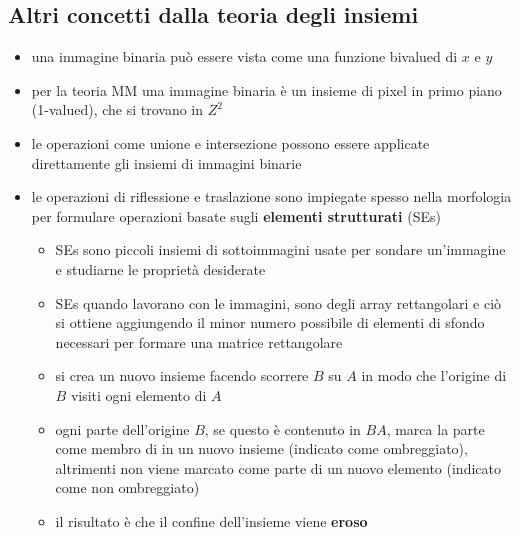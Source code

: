 \subsection{Altri concetti dalla teoria degli insiemi}
\begin{itemize}
	\item una immagine binaria può essere vista come una funzione bivalued di $x$ e $y$
	
	\item per la teoria MM una immagine binaria è un insieme di pixel in primo piano (1-valued), che si trovano in $Z^2$
	
	\item le operazioni come unione e intersezione possono essere applicate direttamente gli insiemi di immagini binarie
	
	\item le operazioni di riflessione e traslazione sono impiegate spesso nella morfologia per formulare operazioni basate sugli \textbf{elementi strutturati} (SEs)
	\begin{itemize}
		\item SEs sono piccoli insiemi di sottoimmagini usate per sondare un'immagine e studiarne le proprietà desiderate
		
		\item SEs quando lavorano con le immagini, sono degli array rettangolari e ciò si ottiene aggiungendo il minor numero possibile di elementi di sfondo necessari per formare una matrice rettangolare
		
		\item si crea un nuovo insieme facendo scorrere $B$ su $A$ in modo che l'origine di $B$ visiti ogni elemento di $A$
		
		\item ogni parte dell'origine $B$, se questo è contenuto in $BA$, marca la parte come membro di in un nuovo insieme (indicato come ombreggiato), altrimenti non viene marcato come parte di un nuovo elemento (indicato come non ombreggiato)
		
		\item il risultato è che il confine dell'insieme viene \textbf{eroso}
	\end{itemize}
\end{itemize}

